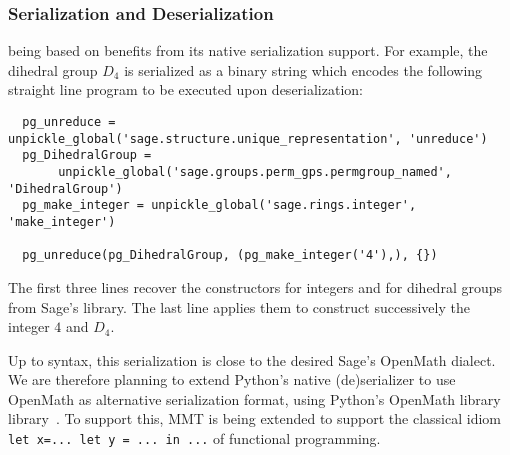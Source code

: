 \subsubsection{Serialization and Deserialization}

\Sage being based on \Python benefits from its native serialization
support. For example, the dihedral group $D_4$ is serialized as a
binary string which encodes the following straight line program to be
executed upon deserialization:
\begin{lstlisting}
  pg_unreduce = unpickle_global('sage.structure.unique_representation', 'unreduce')
  pg_DihedralGroup = 
       unpickle_global('sage.groups.perm_gps.permgroup_named', 'DihedralGroup')
  pg_make_integer = unpickle_global('sage.rings.integer', 'make_integer')

  pg_unreduce(pg_DihedralGroup, (pg_make_integer('4'),), {})
\end{lstlisting}
The first three lines recover the constructors for integers and for
dihedral groups from Sage's library. The last line applies them to
construct successively the integer $4$ and $D_4$.

Up to syntax, this serialization is close to the desired Sage's
OpenMath dialect.
We are therefore planning to extend Python's native (de)serializer to
use OpenMath as alternative serialization format, using Python's
OpenMath library library~\cite{py-openmath:on}. To support this, MMT
is being extended to support the classical idiom
\lstinline{let x=... let y = ... in ...}
of functional programming.

